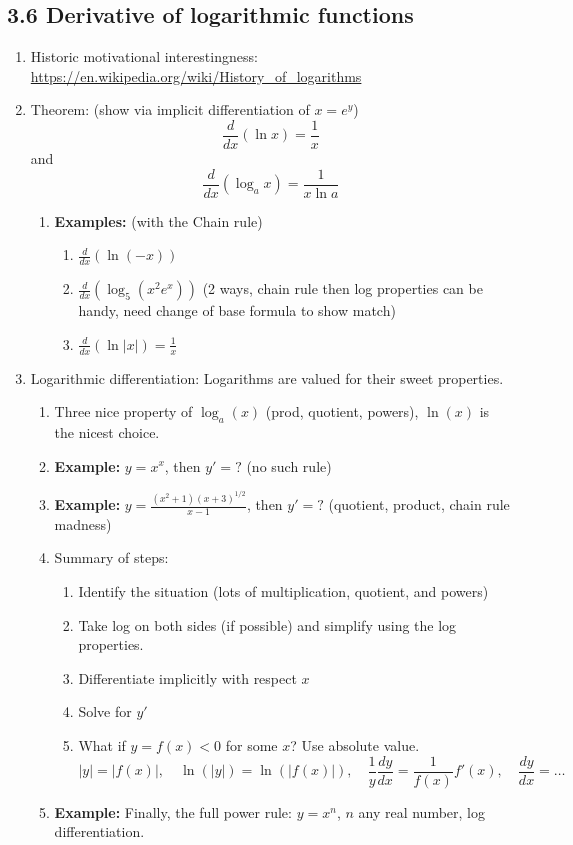 \documentclass{article}
\begin{document}
\subsection{3.6 Derivative of logarithmic functions}
\begin{enumerate}

\item Historic motivational interestingness: \url{https://en.wikipedia.org/wiki/History_of_logarithms}

\item Theorem: (show via implicit differentiation of $x=e^y$)
$$
\frac{d}{dx}(\ln x) = \frac{1}{x}
$$
and
$$
\frac{d}{dx}(\log_a x) = \frac{1}{x\ln a}
$$
\begin{enumerate}
\item {\bf Examples:} (with the Chain rule)
\begin{enumerate}
\item $\frac{d}{dx} (\ln (-x))$
\item $\frac{d}{dx} (\log_5 (x^2 e^x))$ (2 ways, chain rule then log properties can be handy, need change of base formula to show match)
\item $\frac{d}{dx}(\ln |x|) = \frac{1}{x}$
\end{enumerate}
\end{enumerate}

\item Logarithmic differentiation: Logarithms are valued for their sweet properties.
\begin{enumerate}
\item Three nice property of $\log_a (x)$ (prod, quotient, powers), $\ln(x)$ is the nicest choice.
\item {\bf Example:} $y = x^x$, then $y'=?$ (no such rule)
\item {\bf Example:} $y = \frac{(x^2+1)(x+3)^{1/2}}{x-1}$, then $y'=?$ (quotient, product, chain rule madness)
\item Summary of steps: 
\begin{enumerate}
\item  Identify the situation (lots of multiplication, quotient, and powers)
\item Take log on both sides (if possible) and simplify using the log properties.
\item Differentiate implicitly with respect $x$
\item Solve for $y'$
\item What if $y=f(x)<0$ for some $x$? Use absolute value.
$$
|y|=|f(x)|, \quad \ln(|y|)=\ln(|f(x)|), \quad \frac{1}{y}\frac{dy}{dx} = \frac{1}{f(x)}f'(x), \quad \frac{dy}{dx}=\dots 
$$
\end{enumerate}
\item {\bf Example:} Finally, the full power rule: $y = x^n$, $n$ any real number, log differentiation.
\end{enumerate}


\end{enumerate}
\end{document}
